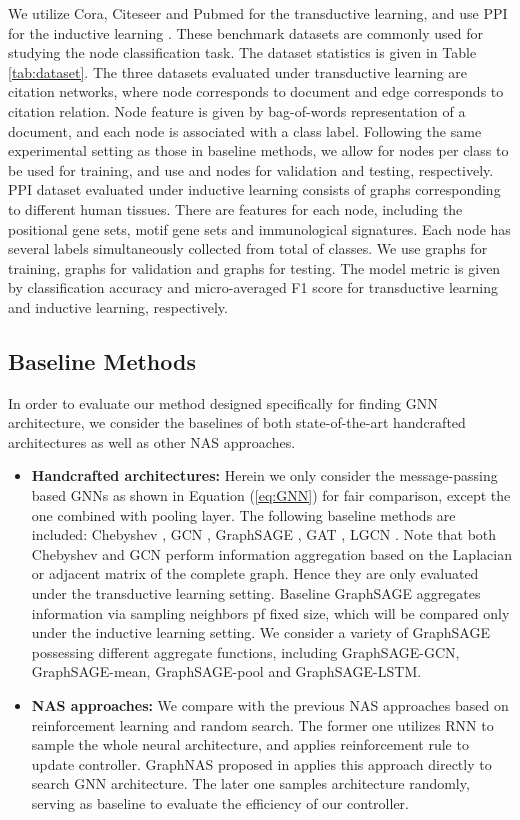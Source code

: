 \documentclass[sigconf]{acmart}
\begin{document}
We utilize Cora, Citeseer and Pubmed \cite{sen2008collective} for the transductive learning, and use PPI for the inductive learning \cite{zitnik2017predicting}. These benchmark datasets are commonly used for studying the node classification task. The dataset statistics is given in Table \ref{tab:dataset}. The three datasets evaluated under transductive learning are citation networks, where node corresponds to document and edge corresponds to citation relation. Node feature is given by bag-of-words representation of a document, and each node is associated with a class label. Following the same experimental setting as those in baseline methods, we allow for  nodes per class to be used for training, and use  and  nodes for validation and testing, respectively. PPI dataset evaluated under inductive learning consists of graphs corresponding to different human tissues. There are  features for each node, including the positional gene sets, motif gene sets and immunological signatures. Each node has several labels simultaneously collected from total of  classes. We use  graphs for training,  graphs for validation and  graphs for testing. The model metric is given by classification accuracy and micro-averaged F1 score for transductive learning and inductive learning, respectively.

\subsection{Baseline Methods}
In order to evaluate our method designed specifically for finding GNN architecture, we consider the baselines of both state-of-the-art handcrafted architectures as well as other NAS approaches. 
\begin{itemize}
    \item \textbf{Handcrafted architectures:} Herein we only consider the message-passing based GNNs as shown in Equation (\ref{eq:GNN}) for fair comparison, except the one combined with pooling layer. The following baseline methods are included: Chebyshev \cite{defferrard2016convolutional}, GCN \cite{kipf2016semi}, GraphSAGE \cite{hamilton2017inductive}, GAT \cite{velickovic2017graph}, LGCN \cite{gao2018large}. Note that both Chebyshev and GCN perform information aggregation based on the Laplacian or adjacent matrix of the complete graph. Hence they are only evaluated under the transductive learning setting. Baseline GraphSAGE aggregates information via sampling neighbors pf fixed size, which will be compared only under the inductive learning setting. We consider a variety of GraphSAGE possessing different aggregate functions, including GraphSAGE-GCN, GraphSAGE-mean, GraphSAGE-pool and GraphSAGE-LSTM.
    \item \textbf{NAS approaches:} We compare with the previous NAS approaches based on reinforcement learning and random search. The former one utilizes RNN to sample the whole neural architecture, and applies reinforcement rule to update controller. GraphNAS proposed in \cite{gao2019graphnas} applies this approach directly to search GNN architecture. The later one samples architecture randomly, serving as baseline to evaluate the efficiency of our controller.    
\end{itemize}
\end{document}
